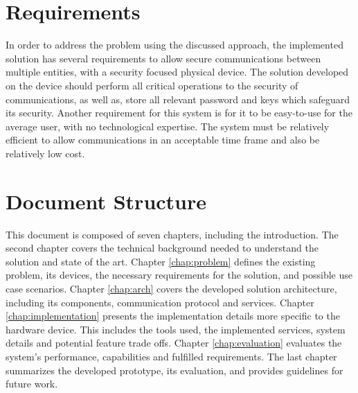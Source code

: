 \section{Requirements}\label{chap:intro:requirements}

In order to address the problem using the discussed approach, the implemented solution has several requirements to allow secure communications between multiple entities, with a security focused physical device.
The solution developed on the device should perform all critical operations to the security of communications, as well as, store all relevant password and keys which safeguard its security. Another requirement for this system is for it to be easy-to-use for the average user, with no technological expertise. The system must be relatively efficient to allow communications in an acceptable time frame and also be relatively low cost.

\section{Document Structure}\label{chap:intro:doc}

This document is composed of seven chapters, including the introduction. The second chapter covers the technical background needed to understand the solution and state of the art.
Chapter \ref{chap:problem} defines the existing problem, its devices, the necessary requirements for the solution, and possible use case scenarios.
Chapter \ref{chap:arch} covers the developed solution architecture, including its components, communication protocol and services.
Chapter \ref{chap:implementation} presents the implementation details more specific to the hardware device. This includes the tools used, the implemented services, system details and potential feature trade offs. Chapter \ref{chap:evaluation} evaluates the system's performance, capabilities and fulfilled requirements. The last chapter summarizes the developed prototype, its evaluation, and provides guidelines for future work.
